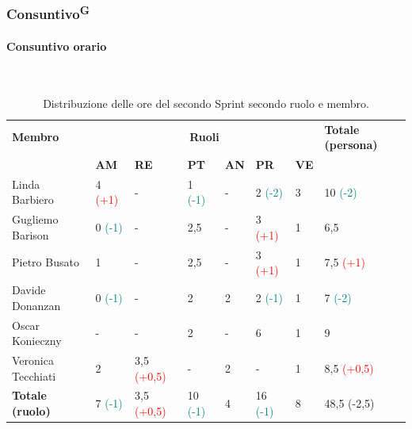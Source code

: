\documentclass[8pt]{article}
\newcommand{\glossterm}[1]{#1\textsuperscript{G}} %
\newcommand{\subsubsubsection}[1]{\paragraph{#1}\mbox{}\\}
\begin{document}
\subsubsection{\glossterm{Consuntivo}}
\subsubsubsection{Consuntivo orario}
\begin{table}[ht!]
	\centering
    \begin{tabular}{p{4cm}*{6}{l}p{3cm}}
        \toprule
		\textbf{Membro} & \multicolumn{6}{c}{\textbf{Ruoli}} & \textbf{Totale
        (persona)}\\
		& \textbf{AM} & \textbf{RE} & \textbf{PT} & \textbf{AN} & \textbf{PR} & \textbf{VE}\\
		\midrule
        Linda Barbiero & 4 \textcolor{red}{(+1)} & - & 1 \textcolor{teal}{(-1)} & - & 2 \textcolor{teal}{(-2)} & 3 & 10 \textcolor{teal}{(-2)} \\ 
        Gugliemo Barison & 0 \textcolor{teal}{(-1)} & - & 2,5 & - & 3 \textcolor{red}{(+1)} & 1 & 6,5 \\ 
        Pietro Busato & 1 & - & 2,5 & - & 3 \textcolor{red}{(+1)} & 1 & 7,5 \textcolor{red}{(+1)} \\ 
        Davide Donanzan & 0 \textcolor{teal}{(-1)} & - & 2 & 2 & 2 \textcolor{teal}{(-1)} & 1 & 7 \textcolor{teal}{(-2)} \\ 
        Oscar Konieczny & - & - & 2 & - & 6 & 1 & 9 \\ 
        Veronica Tecchiati & 2 & 3,5 \textcolor{red}{(+0,5)} & - & 2 & - & 1 & 8,5 \textcolor{red}{(+0,5)} \\ 
        \midrule
        \textbf{Totale (ruolo)} & 7 \textcolor{teal}{(-1)} & 3,5 \textcolor{red}{(+0,5)} & 10 \textcolor{teal}{(-1)} & 4 & 16 \textcolor{teal}{(-1)} & 8 & 48,5 (-2,5) \\ 
        \bottomrule
	\end{tabular}
	\caption{Distribuzione delle ore del secondo Sprint secondo ruolo e membro.}
	\label{table:Distribuzione delle ore consuntive del secondo Sprint secondo ruolo e membro}
\end{table}
\end{document}
